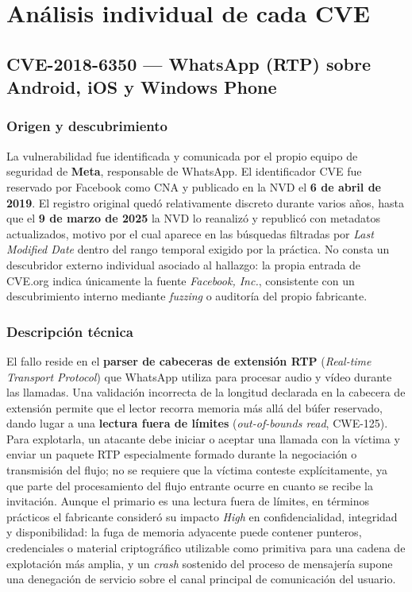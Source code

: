 \chapter{Análisis individual de cada CVE}

\section{CVE-2018-6350 --- WhatsApp (RTP) sobre Android, iOS y Windows Phone}

\subsection*{Origen y descubrimiento}

La vulnerabilidad fue identificada y comunicada por el propio equipo de seguridad de \textbf{Meta}, responsable de WhatsApp. El identificador CVE fue reservado por Facebook como CNA y publicado en la NVD el \textbf{6 de abril de 2019}. El registro original quedó relativamente discreto durante varios años, hasta que el \textbf{9 de marzo de 2025} la NVD lo reanalizó y republicó con metadatos actualizados, motivo por el cual aparece en las búsquedas filtradas por \textit{Last Modified Date} dentro del rango temporal exigido por la práctica. No consta un descubridor externo individual asociado al hallazgo: la propia entrada de CVE.org indica únicamente la fuente \textit{Facebook, Inc.}, consistente con un descubrimiento interno mediante \textit{fuzzing} o auditoría del propio fabricante.

\subsection*{Descripción técnica}

El fallo reside en el \textbf{parser de cabeceras de extensión RTP} (\textit{Real-time Transport Protocol}) que WhatsApp utiliza para procesar audio y vídeo durante las llamadas. Una validación incorrecta de la longitud declarada en la cabecera de extensión permite que el lector recorra memoria más allá del búfer reservado, dando lugar a una \textbf{lectura fuera de límites} (\textit{out-of-bounds read}, CWE-125). Para explotarla, un atacante debe iniciar o aceptar una llamada con la víctima y enviar un paquete RTP especialmente formado durante la negociación o transmisión del flujo; no se requiere que la víctima conteste explícitamente, ya que parte del procesamiento del flujo entrante ocurre en cuanto se recibe la invitación. Aunque el primario es una lectura fuera de límites, en términos prácticos el fabricante consideró su impacto \textit{High} en confidencialidad, integridad y disponibilidad: la fuga de memoria adyacente puede contener punteros, credenciales o material criptográfico utilizable como primitiva para una cadena de explotación más amplia, y un \textit{crash} sostenido del proceso de mensajería supone una denegación de servicio sobre el canal principal de comunicación del usuario.

